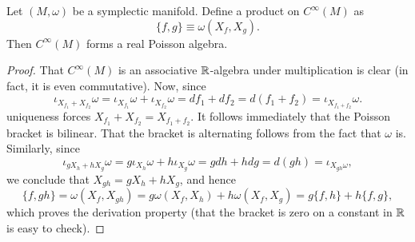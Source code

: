 \documentclass{amsart}
\begin{document}
\begin{proposition}
    Let $(M,\omega)$ be a symplectic manifold. Define a product on $C^\infty(M)$ as
    \begin{equation*}
        \{f,g\} \equiv \omega(X_f,X_g).
    \end{equation*}
    Then $C^\infty(M)$ forms a real Poisson algebra.
    \label{prop:symppoisson}
\end{proposition}
\begin{proof}
    That $C^\infty(M)$ is an associative $\mathbb{R}$-algebra under multiplication is clear
    (in fact, it is even commutative).
    Now, since
    \begin{equation*}
        \iota_{X_{f_1}+X_{f_2}}\omega=\iota_{X_{f_1}}\omega+\iota_{X_{f_2}}\omega=df_1+df_2=d(f_1+f_2)=\iota_{X_{f_1+f_2}}\omega.
    \end{equation*}
    uniqueness forces $X_{f_1}+X_{f_2}=X_{f_1+f_2}$. It follows immediately that the
    Poisson bracket is bilinear.
    That the bracket is alternating follows from the fact that $\omega$ is.
    Similarly, since
    \begin{equation*}
        \iota_{gX_h+hX_g}\omega=g\iota_{X_h}\omega+h\iota_{X_g}\omega=gdh+hdg=d(gh)=\iota_{X_{gh}\omega},
    \end{equation*}
    we conclude that $X_{gh}=gX_h+hX_g$, and hence
    \begin{equation*}
        \{f,gh\}=\omega(X_f,X_{gh})=g\omega(X_f,X_h)+h\omega(X_f,X_g)=g\{f,h\}+h\{f,g\},
    \end{equation*}
    which proves the derivation property (that the bracket is zero on a constant in $\mathbb{R}$ is easy to check).
    

\end{proof}
\end{document}
